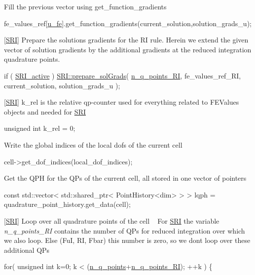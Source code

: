  Fill the previous vector using get\+\_\+function\+\_\+gradients 
\begin{DoxyCode}
fe\_values\_ref[\hyperlink{assembly__routine__SRI_8cc_ae50a49c136e49c33fcd5a555a00009dd}{u\_fe}].get\_function\_gradients(current\_solution,solution\_grads\_u);
\end{DoxyCode}
 \mbox{[}\hyperlink{namespaceSRI}{S\+RI}\mbox{]} Prepare the solutions gradients for the RI rule. Herein we extend the given vector of solution gradients by the additional gradients at the reduced integration quadrature points. 
\begin{DoxyCode}
\textcolor{keywordflow}{if} ( \hyperlink{assembly__routine__SRI_8cc_a535468030220abae9305a26e9d7f7401}{SRI\_active} )
    \hyperlink{namespaceSRI_add98d0fc70a6c51803dfd8c491547413}{SRI::prepare\_solGrads}( \hyperlink{assembly__routine__SRI_8cc_a0b72b2a33d52b7597b87df35b5b92415}{n\_q\_points\_RI}, fe\_values\_ref\_RI, 
      current\_solution, solution\_grads\_u );
\end{DoxyCode}
 \mbox{[}\hyperlink{namespaceSRI}{S\+RI}\mbox{]} k\+\_\+rel is the relative qp-\/counter used for everything related to F\+E\+Values objects and needed for \hyperlink{namespaceSRI}{S\+RI} 
\begin{DoxyCode}
\textcolor{keywordtype}{unsigned} \textcolor{keywordtype}{int} k\_rel = 0;
\end{DoxyCode}
 Write the global indices of the local dofs of the current cell 
\begin{DoxyCode}
cell->get\_dof\_indices(local\_dof\_indices);
\end{DoxyCode}
 Get the Q\+PH for the Q\+Ps of the current cell, all stored in one vector of pointers 
\begin{DoxyCode}
\textcolor{keyword}{const} std::vector< std::shared\_ptr< PointHistory<dim> > > lqph = quadrature\_point\_history.get\_data(cell);
\end{DoxyCode}
 \mbox{[}\hyperlink{namespaceSRI}{S\+RI}\mbox{]} Loop over all quadrature points of the cell ~\newline
For \hyperlink{namespaceSRI}{S\+RI} the variable {\itshape n\+\_\+q\+\_\+points\+\_\+\+RI} contains the number of Q\+Ps for reduced integration over which we also loop. Else (FuI, RI, Fbar) this number is zero, so we don\textquotesingle{}t loop over these additional Q\+Ps 
\begin{DoxyCode}
\textcolor{keywordflow}{for}( \textcolor{keywordtype}{unsigned} \textcolor{keywordtype}{int} k=0; k < (\hyperlink{assembly__routine__SRI_8cc_afd52b693751274175b93a58458201e6b}{n\_q\_points}+\hyperlink{assembly__routine__SRI_8cc_a0b72b2a33d52b7597b87df35b5b92415}{n\_q\_points\_RI}); ++k )
\{
\end{DoxyCode}
